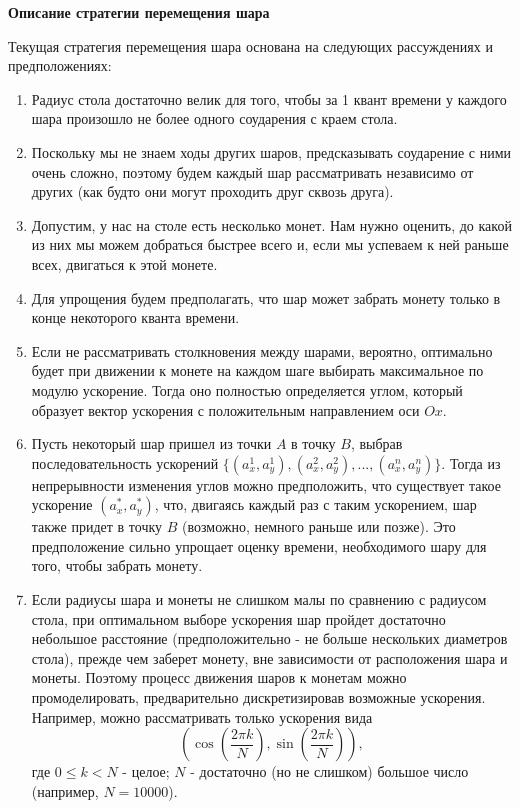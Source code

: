 ﻿\documentclass[12pt,a4paper]{article}
\begin{document}
\begin{center}
    \Large \bf Описание стратегии перемещения шара
\end{center}

Текущая стратегия перемещения шара основана на следующих рассуждениях и предположениях:
\begin{enumerate} 
\item Радиус стола достаточно велик для того, чтобы за 1 квант времени у каждого шара произошло не более одного соударения с краем стола.
\item Поскольку мы не знаем ходы других шаров, предсказывать соударение с ними очень сложно, поэтому будем каждый шар рассматривать независимо от других (как будто они могут проходить друг сквозь друга).
\item Допустим, у нас на столе есть несколько монет. Нам нужно оценить, до какой из них мы можем добраться быстрее всего и, если мы успеваем к ней раньше всех, двигаться к этой монете.
\item Для упрощения будем предполагать, что шар может забрать монету только в конце некоторого кванта времени.
\item Если не рассматривать столкновения между шарами, вероятно, оптимально будет при движении к монете на каждом шаге выбирать максимальное по модулю ускорение. Тогда оно полностью определяется углом, который образует вектор ускорения с положительным направлением оси \(Ox\). 
\item Пусть некоторый шар пришел из точки \(A\) в точку \(B\), выбрав последовательность ускорений \(\{(a_x^1,a_y^1),(a_x^2,a_y^2),...,(a_x^n,a_y^n)\}\). Тогда из непрерывности изменения углов можно предположить, что существует такое ускорение \((a_x^*,a_y^*)\), что, двигаясь каждый раз с таким ускорением, шар также придет в точку \(B\) (возможно, немного раньше или позже). Это предположение сильно упрощает оценку времени, необходимого шару для того, чтобы забрать монету.
\item Если радиусы шара и монеты не слишком малы по сравнению с радиусом стола, при оптимальном выборе ускорения шар пройдет достаточно небольшое расстояние (предположительно - не больше нескольких диаметров стола), прежде чем заберет монету, вне зависимости от расположения шара и монеты. Поэтому процесс движения шаров к монетам можно промоделировать, предварительно дискретизировав возможные ускорения. Например, можно рассматривать только ускорения вида 
\[\left(\cos \left( \frac{2 \pi k}{N}  \right), \sin \left( \frac{2 \pi k}{N}  \right) \right),\]
где \(0 \le k<N\)  -  целое; \(N\) - достаточно (но не слишком) большое число (например, \(N=10000\)).
\end{enumerate}
\end{document}

